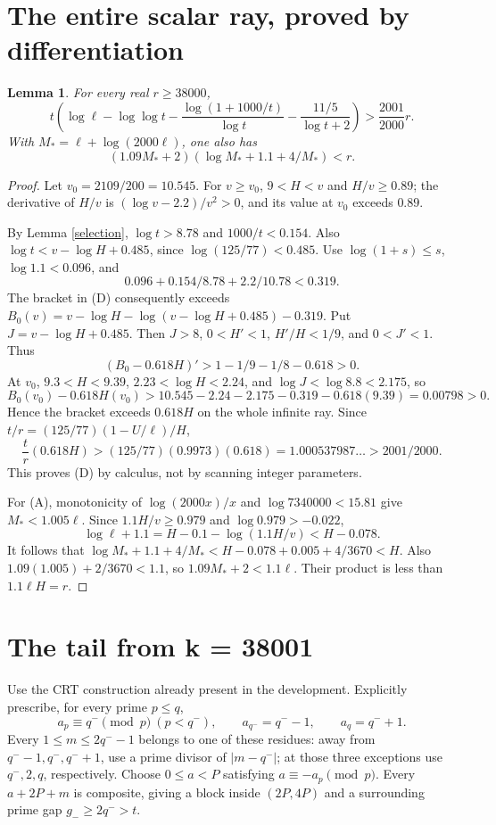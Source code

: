 \documentclass[11pt]{article}
\newtheorem{lemma}[theorem]{Lemma}
\begin{document}
\section{The entire scalar ray, proved by differentiation}
\begin{lemma}\label{scalar}
For every real $r\ge38000$,
\[
 t\left(\log\ell-\log\log t
 -\frac{\log(1+1000/t)}{\log t}
 -\frac{11/5}{\log t+2}\right)>\frac{2001}{2000}r. \tag{D}
\]
With $M_*=\ell+\log(2000\ell)$, one also has
\[
 (1.09M_*+2)(\log M_*+1.1+4/M_*)<r. \tag{A}
\]
\end{lemma}
\begin{proof}
Let $v_0=2109/200=10.545$. For $v\ge v_0$, $9<H<v$ and
$H/v\ge0.89$; the derivative of $H/v$ is
$(\log v-2.2)/v^2>0$, and its value at $v_0$ exceeds $0.89$.

By Lemma \ref{selection}, $\log t>8.78$ and $1000/t<0.154$.
Also $\log t<v-\log H+0.485$, since $\log(125/77)<0.485$.
Use $\log(1+s)\le s$, $\log1.1<0.096$, and
\[
 0.096+0.154/8.78+2.2/10.78<0.319.
\]
The bracket in (D) consequently exceeds
$B_0(v)=v-\log H-\log(v-\log H+0.485)-0.319$.
Put $J=v-\log H+0.485$.
Then $J>8$, $0<H'<1$, $H'/H<1/9$, and $0<J'<1$. Thus
\[
 (B_0-0.618H)'>1-1/9-1/8-0.618>0.
\]
At $v_0$, $9.3<H<9.39$, $2.23<\log H<2.24$, and
$\log J<\log8.8<2.175$, so
\[
 B_0(v_0)-0.618H(v_0)>
 10.545-2.24-2.175-0.319-0.618(9.39)=0.00798>0.
\]
Hence the bracket exceeds $0.618H$ on the whole infinite ray.
Since $t/r=(125/77)(1-U/\ell)/H$,
\[
 \frac{t}{r}(0.618H)>
 (125/77)(0.9973)(0.618)
 =1.000537987\ldots>2001/2000.
\]
This proves (D) by calculus, not by scanning integer parameters.

For (A), monotonicity of $\log(2000x)/x$ and
$\log7340000<15.81$ give $M_*<1.005\ell$.
Since $1.1H/v\ge0.979$ and $\log0.979>-0.022$,
\[
 \log\ell+1.1=H-0.1-\log(1.1H/v)<H-0.078.
\]
It follows that $\log M_*+1.1+4/M_*<H-0.078+0.005+4/3670<H$.
Also $1.09(1.005)+2/3670<1.1$, so $1.09M_*+2<1.1\ell$.
Their product is less than $1.1\ell H=r$.
\end{proof}

\section{The tail from k = 38001}
Use the CRT construction already present in the development.
Explicitly prescribe, for every prime $p\le q$,
\[
 a_p\equiv q^-\pmod p\ (p<q^-),\qquad
 a_{q^-}=q^--1,\qquad a_q=q^-+1 .
\]
Every $1\le m\le2q^--1$ belongs to one of these residues:
away from $q^--1,q^-,q^-+1$, use a prime divisor of $|m-q^-|$;
at those three exceptions use $q^-,2,q$, respectively.
Choose $0\le a<P$ satisfying $a\equiv-a_p\pmod p$.
Every $a+2P+m$ is composite, giving a block inside $(2P,4P)$
and a surrounding prime gap $g_-\ge2q^->t$.
\end{document}
